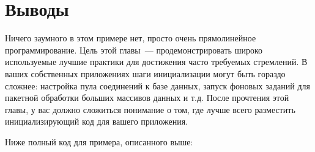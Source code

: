 \section{Выводы}
Ничего заумного в этом примере нет, просто очень прямолинейное
программирование. Цель этой главы~--- продемонстрировать широко используемые
лучшие практики для достижения часто требуемых стремлений. В ваших собственных
приложениях шаги инициализации могут быть гораздо сложнее: настройка пула
соединений к базе данных, запуск фоновых заданий для пакетной обработки больших
массивов данных и т.д. После прочтения этой главы, у вас должно сложиться
понимание о том, где лучше всего разместить инициализирующий код для вашего
приложения.

Ниже полный код для примера, описанного выше:
